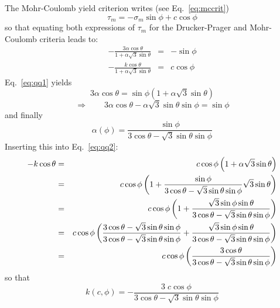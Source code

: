 The Mohr-Coulomb yield criterion writes  (see Eq.~\eqref{eq:mccrit})
\[
\tau_m = -\sigma_m \sin\phi + c \cos\phi
\]
so that equating both expressions of $\tau_m$ for the Drucker-Prager 
and Mohr-Coulomb criteria leads to:
\begin{eqnarray}
-\frac{3 \alpha \cos\theta}{1 + \alpha \sqrt{3}\sin\theta} &=& -\sin\phi \label{eq:qq1}\\
-\frac{k\cos\theta}{1 + \alpha \sqrt{3}\sin\theta} &=& c \cos\phi \label{eq:qq2}
\end{eqnarray}
Eq.~\eqref{eq:qq1} yields
\[
3 \alpha \cos\theta = \sin\phi (1 + \alpha \sqrt{3}\sin\theta) 
\]
\[
\Rightarrow \qquad 3 \alpha \cos\theta - \alpha \sqrt{3}\sin\theta \sin\phi = \sin\phi 
\]
and finally 
\[
\boxed{
\alpha(\phi) =  \frac{\sin\phi}{ 3 \cos\theta - \sqrt{3}\sin\theta \sin\phi}
}
\]
Inserting this into Eq.~\eqref{eq:qq2}:
\begin{eqnarray}
- k \cos\theta 
&=& c \cos \phi \left(1 +\alpha \sqrt{3} \sin\theta \right)  \nonumber\\
&=& c \cos \phi \left(1 + \frac{\sin\phi}{ 3 \cos\theta - \sqrt{3}\sin\theta \sin\phi}  \sqrt{3} \sin\theta\right) \nonumber\\
&=& c \cos \phi \left(1 + 
\frac{ \sqrt{3}\sin\phi \sin\theta }{ 3 \cos\theta - \sqrt{3}\sin\theta \sin\phi} \right) \nonumber\\
&=& c \cos \phi \left(
\frac{ 3 \cos\theta - \sqrt{3}\sin\theta \sin\phi}{ 3 \cos\theta - \sqrt{3}\sin\theta \sin\phi} 
+ 
\frac{ \sqrt{3}\sin\phi \sin\theta }{ 3 \cos\theta - \sqrt{3}\sin\theta \sin\phi} \right) \nonumber\\
&=& c \cos \phi \left(
\frac{ 3 \cos\theta}{ 3 \cos\theta - \sqrt{3}\sin\theta \sin\phi} \right) \nonumber
\end{eqnarray}
so that 
\[
\boxed{
k(c,\phi) =- \frac{ 3\; c \cos \phi }{ 3 \cos\theta - \sqrt{3}\sin\theta \sin\phi} 
}
\]

